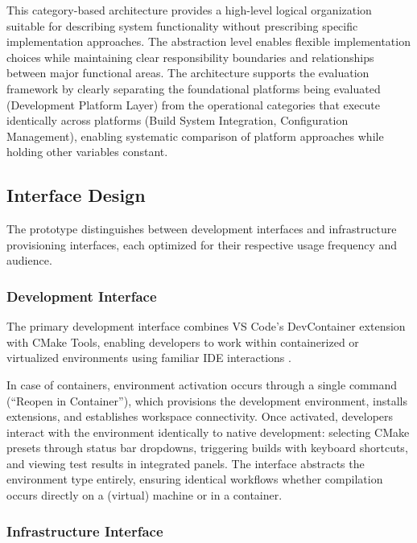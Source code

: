 This category-based architecture provides a high-level logical organization suitable for describing system functionality without prescribing specific implementation approaches.
The abstraction level enables flexible implementation choices while maintaining clear responsibility boundaries and relationships between major functional areas.
The architecture supports the evaluation framework by clearly separating the foundational platforms being evaluated (Development Platform Layer) from the operational categories that execute identically across platforms (Build System Integration, Configuration Management), enabling systematic comparison of platform approaches while holding other variables constant.

\subsection{Interface Design}

The prototype distinguishes between development interfaces and infrastructure provisioning interfaces, each optimized for their respective usage frequency and audience.

\subsubsection{Development Interface}

The primary development interface combines VS Code's DevContainer extension with CMake Tools, enabling developers to work within containerized or virtualized environments using familiar IDE interactions \citep{microsoftDevelopingContainer2025, swidzinskiModernCMakeEffortlessly2024}.

In case of containers, environment activation occurs through a single command (``Reopen in Container''), which provisions the development environment, installs extensions, and establishes workspace connectivity.
Once activated, developers interact with the environment identically to native development: selecting CMake presets through status bar dropdowns, triggering builds with keyboard shortcuts, and viewing test results in integrated panels.
The interface abstracts the environment type entirely, ensuring identical workflows whether compilation occurs directly on a (virtual) machine or in a container.

\subsubsection{Infrastructure Interface}

